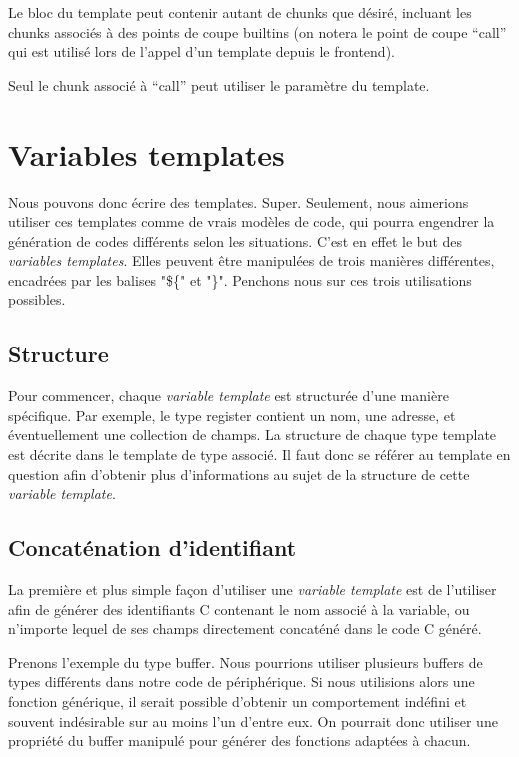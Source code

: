 \documentclass[french]{rtxreport}
\begin{document}
Le bloc du template peut contenir autant de chunks que désiré, incluant les
chunks associés à des points de coupe builtins (on notera le point de coupe
``call'' qui est utilisé lors de l'appel d'un template depuis le frontend).

Seul le chunk associé à ``call'' peut utiliser le paramètre du template.


\chapter{Variables templates}

Nous pouvons donc écrire des templates. Super. Seulement, nous aimerions
utiliser ces templates comme de vrais modèles de code, qui pourra engendrer la
génération de codes différents selon les situations. C'est en effet le but des
\emph{variables templates}. Elles peuvent être manipulées de trois manières
différentes, encadrées par les balises "\$\{" et "\}". Penchons nous sur ces
trois utilisations possibles.


\section{Structure}

Pour commencer, chaque \emph{variable template} est structurée d'une manière
spécifique. Par exemple, le type register contient un nom, une adresse, et
éventuellement une collection de champs. La structure de chaque type template
est décrite dans le template de type associé. Il faut donc se référer au
template en question afin d'obtenir plus d'informations au sujet de la
structure de cette \emph{variable template}.


\section{Concaténation d'identifiant}

La première et plus simple façon d'utiliser une \emph{variable template} est de
l'utiliser afin de générer des identifiants C contenant le nom associé à la
variable, ou n'importe lequel de ses champs directement concaténé dans le code
C généré.

Prenons l'exemple du type buffer. Nous pourrions utiliser plusieurs buffers de
types différents dans notre code de périphérique. Si nous utilisions alors une
fonction générique, il serait possible d'obtenir un comportement indéfini et
souvent indésirable sur au moins l'un d'entre eux. On pourrait donc utiliser
une propriété du buffer manipulé pour générer des fonctions adaptées à chacun.
\end{document}
